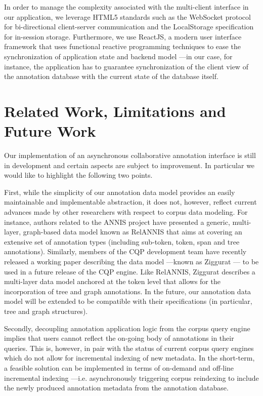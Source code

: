 \documentclass{sig-alternate}
\begin{document}
In order to manage the complexity associated with the multi-client interface in our application,
we leverage HTML5 standards such as the WebSocket protocol for bi-directional client-server
communication and the LocalStorage specification for in-session storage. Furthermore, we use
ReactJS, a modern user interface framework that uses functional reactive programming techniques to
ease the synchronization of application state and backend model ---in our case, for instance,
the application has to guarantee synchronization of the client view of the annotation database
with the current state of the database itself.

\section{Related Work, Limitations and Future Work}\label{sec:future}
Our implementation of an asynchronous collaborative annotation interface is still in development
and certain aspects are subject to improvement. In particular we would like to highlight the
following two points.

First, while the simplicity of our annotation data model provides an easily maintainable and
implementable abstraction, it does not, however, reflect current advances made by other researchers
with respect to corpus data modeling. For instance, authors related to the ANNIS project have
presented a generic, multi-layer, graph-based data model known as RelANNIS \cite{Krause2016} that
aims at covering an extensive set of annotation types (including sub-token, token, span and
tree annotations). Similarly, members of the CQP development team have recently released a working
paper describing the data model ---known as Ziggurat \cite{Evert2015}--- to be
used in a future release of the CQP engine. Like RelANNIS, Ziggurat describes a multi-layer
data model anchored at the token level that allows for the incorporation of tree and graph
annotations. In the future, our annotation data model will be extended to be compatible with their
specifications (in particular, tree and graph structures).

Secondly, decoupling annotation application logic from the corpus query engine implies that
users cannot reflect the on-going body of annotations in their queries. This is, however, in
pair with the status of current corpus query engines which do not allow for incremental indexing of
new metadata. In the short-term, a feasible solution can be implemented in terms of
on-demand and off-line incremental indexing ---i.e. asynchronously triggering corpus
reindexing to include the newly produced annotation metadata from the annotation database.
\end{document}
